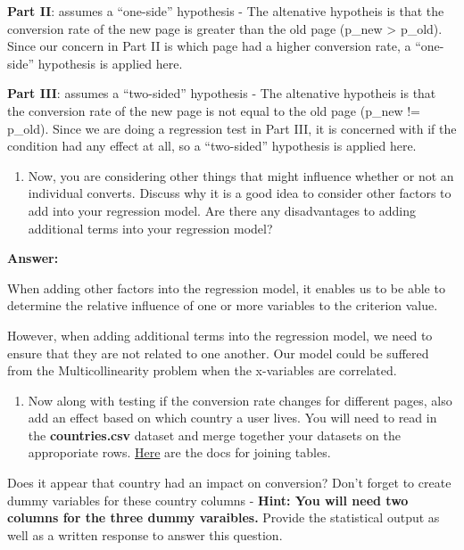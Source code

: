 \documentclass[11pt]{article}
\providecommand{\tightlist}{%
      \setlength{\itemsep}{0pt}\setlength{\parskip}{0pt}}
\begin{document}
\textbf{Part II}: assumes a ``one-side'' hypothesis - The altenative
hypotheis is that the conversion rate of the new page is greater than
the old page (p\_new \textgreater{} p\_old). Since our concern in Part
II is which page had a higher conversion rate, a ``one-side'' hypothesis
is applied here.

\textbf{Part III}: assumes a ``two-sided'' hypothesis - The altenative
hypotheis is that the conversion rate of the new page is not equal to
the old page (p\_new != p\_old). Since we are doing a regression test in
Part III, it is concerned with if the condition had any effect at all,
so a ``two-sided'' hypothesis is applied here.

    \begin{enumerate}
\def\labelenumi{\alph{enumi}.}
\setcounter{enumi}{5}
\tightlist
\item
  Now, you are considering other things that might influence whether or
  not an individual converts. Discuss why it is a good idea to consider
  other factors to add into your regression model. Are there any
  disadvantages to adding additional terms into your regression model?
\end{enumerate}

    \textbf{Answer:}

When adding other factors into the regression model, it enables us to be
able to determine the relative influence of one or more variables to the
criterion value.

However, when adding additional terms into the regression model, we need
to ensure that they are not related to one another. Our model could be
suffered from the Multicollinearity problem when the x-variables are
correlated.

    \begin{enumerate}
\def\labelenumi{\alph{enumi}.}
\setcounter{enumi}{6}
\tightlist
\item
  Now along with testing if the conversion rate changes for different
  pages, also add an effect based on which country a user lives. You
  will need to read in the \textbf{countries.csv} dataset and merge
  together your datasets on the approporiate rows.
  \href{https://pandas.pydata.org/pandas-docs/stable/generated/pandas.DataFrame.join.html}{Here}
  are the docs for joining tables.
\end{enumerate}

Does it appear that country had an impact on conversion? Don't forget to
create dummy variables for these country columns - \textbf{Hint: You
will need two columns for the three dummy varaibles.} Provide the
statistical output as well as a written response to answer this
question.
\end{document}
